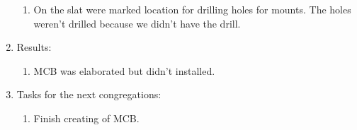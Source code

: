 \begin{enumerate}
\begin{enumerate}
      \item On the slat were marked location for drilling holes for mounts. The holes weren't drilled because we didn't have the drill.
      
    \end{enumerate}
    
	\item Results: 
	\begin{enumerate}
	  \item MCB was elaborated but didn't installed.
      
    \end{enumerate}
    
	\item Tasks for the next congregations:
	\begin{enumerate}
	  \item Finish creating of MCB.
	  
    \end{enumerate}     
\end{enumerate}
\fillpage
